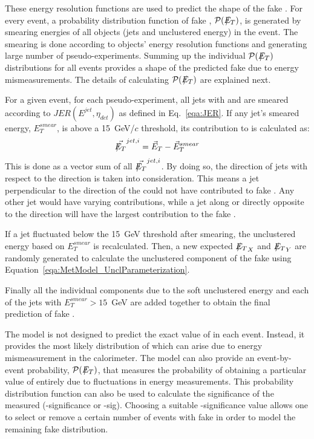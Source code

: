 These energy resolution functions are used to predict the shape of the fake \met. For every event, a probability distribution function of fake \met, ${\cal P}(\met)$, is generated by smearing energies of all objects (jets and unclustered energy) in the event. The smearing is done according to objects' energy resolution functions and generating large number of pseudo-experiments. Summing up the individual ${\cal P}(\met)$ distributions for all events provides a shape of the predicted fake \met due to energy mismeasurements.
The details of calculating ${\cal P}(\met)$ are explained next.

For a given event, for each pseudo-experiment, all jets with  and  are smeared according to $JER(E^{jet},\eta_{det})$ as defined in Eq.~\ref{eqa:JER}. If any jet's smeared energy, $E_{T}^{smear}$, is above a 15~GeV/$c$ threshold, its contribution to \met is calculated as:
\begin{equation}
 \vec{\met}^{jet,i} = \vec{E}_{T}-\vec{E}_{T}^{smear}
\label{eqa:MetSmearing}
\end{equation}
This is done as a vector sum of all $\vec{\met}^{jet,i}$. By doing so, the direction of jets with respect to the \met direction is taken into consideration. This means a jet perpendicular to the direction of the \met could not have contributed to fake \met. Any other jet would have varying contributions, while a jet along or directly opposite to the \met direction will have the largest contribution to the fake \met.

If a jet fluctuated below the 15~GeV threshold after smearing, the unclustered energy based on $E_{T}^{smear}$ is recalculated. Then, a new expected $\met_X$ and $\met_Y$ are randomly generated to calculate the unclustered component of the fake \met using Equation~\ref{eqa:MetModel_UnclParameterization}.

Finally all the individual \met components due to the soft unclustered energy and each of the jets with $E_{T}^{smear}>15$~GeV are added together to obtain the final prediction of fake \met.

The \met model is not designed to predict the exact value of \met in each event. Instead, it provides the most likely distribution of \met which can arise due to energy mismeasurement in the calorimeter. The \met model can also provide an event-by-event probability, ${\cal P}(\met)$, that measures the probability of obtaining a particular value of \met entirely due to fluctuations in energy measurements. This probability distribution function can also be used to calculate the significance of the measured \met (\met-significance or \met-sig). Choosing a suitable \met-significance value allows one to select or remove a certain number of events with fake \met in order to model the remaining fake \met distribution.

